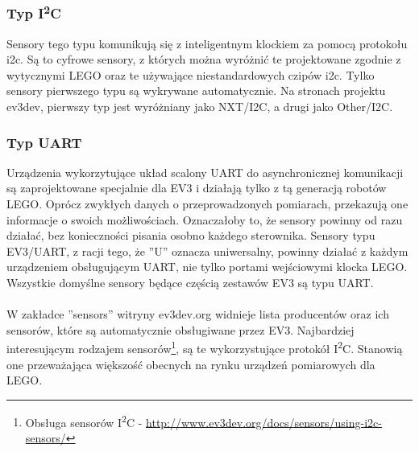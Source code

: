\subsubsection{Typ I\textsuperscript{2}C}

Sensory tego typu komunikują się z inteligentnym klockiem za pomocą protokołu \Gls{i2c}. Są to cyfrowe sensory, z których można wyróżnić te projektowane zgodnie z wytycznymi LEGO oraz te używające niestandardowych czipów \Gls{i2c}. Tylko sensory pierwszego typu są wykrywane automatycznie. Na stronach projektu ev3dev, pierwszy typ jest wyróżniany jako NXT/I2C, a drugi jako Other/I2C.

\subsubsection{Typ UART}

Urządzenia wykorzytujące układ scalony UART do asynchronicznej komunikacji są zaprojektowane specjalnie dla EV3 i działają tylko z tą generacją robotów LEGO. Oprócz zwykłych danych o przeprowadzonych pomiarach, przekazują one informacje o swoich możliwościach. Oznaczałoby to, że sensory powinny od razu działać, bez konieczności pisania osobno każdego sterownika. Sensory typu EV3/UART, z racji tego, że ''U'' oznacza uniwersalny, powinny działać z każdym urządzeniem obsługującym UART, nie tylko portami wejściowymi klocka LEGO. Wszystkie domyślne sensory będące częścią zestawów EV3 są typu UART.\\\\

W zakładce ''sensors'' witryny ev3dev.org widnieje lista producentów oraz ich sensorów, które są automatycznie obsługiwane przez EV3. Najbardziej interesującym rodzajem sensorów\footnote{Obsługa sensorów I\textsuperscript{2}C - \url{http://www.ev3dev.org/docs/sensors/using-i2c-sensors/}}, są te wykorzystujące protokół I\textsuperscript{2}C. Stanowią one przeważająca większość obecnych na rynku urządzeń pomiarowych dla LEGO.

